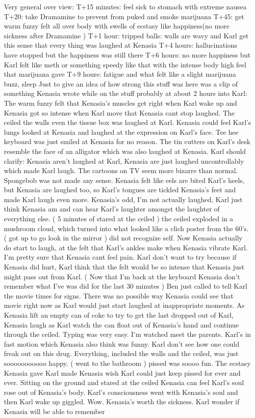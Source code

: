 \documentclass[12pt]{book}
\begin{document}
Very general over view: T+15 minutes: feel sick to stomach with extreme nausea T+20: take Dramamine to prevent from puked and smoke marijuana T+45: get warm fuzzy felt all over body with swells of ecstasy like happiness(no more sickness after Dramamine ) T+1 hour: tripped balls: walls are wavy and Karl get this sense that every thing was laughed at Kenasia T+4 hours: hallucinations have stopped but the happiness was still there T+6 hours: no more happiness but Karl felt like meth or something speedy like that with the intense body high feel that marijuana gave T+9 hours: fatigue and what felt like a slight marijuana buzz, sleep Just to give an idea of how strong this stuff was here was a clip of something Kenasia wrote while on the stuff probably at about 2 hours into Karl: The warm fuzzy felt that Kenasia's muscles get right when Karl wake up and Kenasia got so intense when Karl move that Kenasia cant stop laughed. The ceiled the walls even the tissue box was laughed at Karl. Kenasia could feel Karl's lungs looked at Kenasia and laughed at the expression on Karl's face. Tee hee keyboard was just smiled at Kenasia for no reason. The tin cutters on Karl's desk resemble the face of an alligator which was also laughed at Kenasia. Karl should clarify: Kenasia aren't laughed at Karl, Kenasia are just laughed uncontrollably which made Karl laugh. The cartoons on TV seem more bizarre than normal. Spongebob was not made any sense. Kenasia felt like eels are bited Karl's heels, but Kenasia are laughed too, so Karl's tongues are tickled Kenasia's feet and made Karl laugh even more. Kenasia's odd, I'm not actually laughed, Karl just think Kenasia am and can hear Karl's laughter amongst the laughter of everything else. ( 5 minutes of stared at the ceiled ) the ceiled exploded in a mushroom cloud, which turned into what looked like a clich poster from the 60's. ( got up to go look in the mirror ) did not recognize self. Now Kenasia actually do start to laugh, at the felt that Karl's ankles make when Kenasia vibrate Karl. I'm pretty sure that Kenasia cant feel pain. Karl don't want to try because if Kenasia did hurt, Karl think that the felt would be so intense that Kenasia just might pass out from Karl. ( Now that I'm back at the keyboard Kenasia don't remember what I've was did for the last 30 minutes ) Ben just called to tell Karl the movie times for signs. There was no possible way Kenasia could see that movie right now as Karl would just start laughed at inappropriate moments. As Kenasia lift an empty can of coke to try to get the last dropped out of Karl, Kenasia laugh as Karl watch the can float out of Kenasia's hand and continue through the ceiled. Typing was very easy. I'm watched meet the parents. Karl's in fast motion which Kenasia also think was funny. Karl don't see how one could freak out on this drug. Everything, included the walls and the ceiled, was just sooooooooooo happy. ( went to the bathroom ) pissed was soooo fun. The ecstasy Kenasia gave Karl made Kenasia wish Karl could just keep pissed for ever and ever. Sitting on the ground and stared at the ceiled Kenasia can feel Karl's soul rose out of Kenasia's body. Karl's consciousness went with Kenasia's soul and then Karl wake up giggled. Wow. Kenasia's worth the sickness. Karl wonder if Kenasia will be able to remember 
\end{document}
